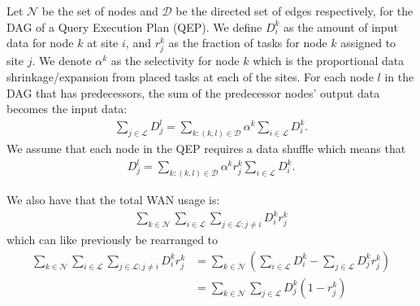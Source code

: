 Let $\mathcal{N}$ be the set of nodes and $\mathcal{D}$ be the directed set of edges respectively, for the DAG of a Query Execution Plan (QEP).
We define $D_i^k$ as the amount of input data for node $k$ at site $i$, and $r_j^k$ as the fraction of tasks for node $k$ assigned to site $j$.
We denote $\alpha^k$ as the selectivity for node $k$ which is the proportional data shrinkage/expansion from placed tasks at each of the sites.
For each node $l$ in the DAG that has predecessors, the sum of the predecessor nodes' output data becomes the input data: 
\begin{align}
	\sum_{j\in\mathcal{L}}D_j^l = \sum_{k:(k,l)\in\mathcal{D}}\alpha^k\sum_{i\in\mathcal{L}}D_i^k.
\end{align}
We assume that each node in the QEP requires a data shuffle which means that
\begin{align}
	D_j^l = \sum_{k:(k,l)\in\mathcal{D}}\alpha^kr_j^k\sum_{i\in\mathcal{L}}D_i^k.
\end{align}

We also have that the total WAN usage is:
\begin{align}
	\sum_{k\in\mathcal{N}}\sum_{i\in\mathcal{L}}\sum_{j\in\mathcal{L}:j\neq i}D_i^kr_j^k
\end{align}
which can like previously be rearranged to
\begin{align}
	\sum_{k\in\mathcal{N}}\sum_{i\in\mathcal{L}}\sum_{j\in\mathcal{L}:j\neq i}D_i^kr_j^k & = \sum_{k\in\mathcal{N}}\left(\sum_{i\in\mathcal{L}}D_i^k - \sum_{j\in\mathcal{L}}D_j^kr_j^k\right) \\
	& =\sum_{k\in\mathcal{N}}\sum_{j\in\mathcal{L}}D_j^k(1-r_j^k)
\end{align}
